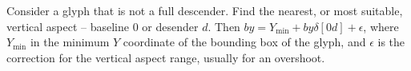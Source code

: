 \documentclass[landscape]{article}
\begin{document}
Consider a glyph that is not a full descender. 
Find the nearest, or most suitable, vertical aspect -- baseline $0$ or desender $d$.
Then $by = Y_\mathrm{min} + by\delta[0d] + \epsilon$, 
where $Y_\mathrm{min}$ in the minimum $Y$ coordinate of the bounding box of the glyph, 
and $\epsilon$ is the correction for the vertical aspect range, usually for an overshoot.


\end{document}
